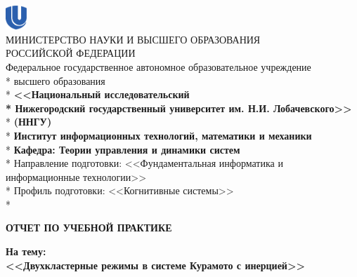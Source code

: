 \begin{titlepage}
	\newpage
	\begin{center}
		\includegraphics[width=0.8cm]{logo_unn_crop.eps} \\
		МИНИСТЕРСТВО  НАУКИ И ВЫСШЕГО ОБРАЗОВАНИЯ \\ 
		РОССИЙСКОЙ  ФЕДЕРАЦИИ  \\
		Федеральное государственное автономное образовательное учреждение\\* высшего образования \\*
		\textbf{<<Национальный исследовательский \\* Нижегородский государственный университет им. Н.И. Лобачевского>>}\\*
		\textbf{(ННГУ)}\\*
		\vspace{2em}
		\textbf{Институт информационных технологий, математики и механики}\\*
		\textbf{Кафедра: Теории управления и динамики систем}\\*
		\vspace{2em}
		Направление подготовки: <<Фундаментальная информатика и информационные технологии>>\\*
		Профиль подготовки: <<Когнитивные системы>>\\*
	\end{center}

	\vspace{1em}

	\begin{center}
		{\Large \textbf{ОТЧЕТ ПО УЧЕБНОЙ ПРАКТИКЕ}}
    \end{center}

    \vspace{2.5em}

	\begin{center}
		{\textbf{На тему:}}\\
		
		{\large \textbf{<<Двухкластерные режимы в системе Курамото с инерцией>>}}
	\end{center}

    \vspace{4em}

    \hfill
    \begin{minipage}[t]{.36\linewidth}
    	\begin{flushleft}
    	

\end{flushleft}
\end{minipage}
\end{titlepage}
